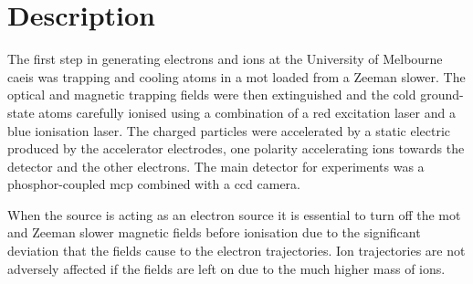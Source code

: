 \section{Description}
The first step in generating electrons and ions at the University of Melbourne \gls{caeis} was trapping and cooling atoms in a \gls{mot} loaded from a Zeeman slower.
The optical and magnetic trapping fields were then extinguished and the cold ground-state atoms carefully ionised using a combination of a red excitation laser and a blue ionisation laser.
The charged particles were accelerated by a static electric produced by the accelerator electrodes, one polarity accelerating ions towards the detector and the other electrons.
The main detector for experiments was a phosphor-coupled \gls{mcp} combined with a \gls{ccd} camera.

When the source is acting as an electron source it is essential to turn off the \gls{mot} and Zeeman slower magnetic fields before ionisation due to the significant deviation that the fields cause to the electron trajectories.
Ion trajectories are not adversely affected if the fields are left on due to the much higher mass of ions.

